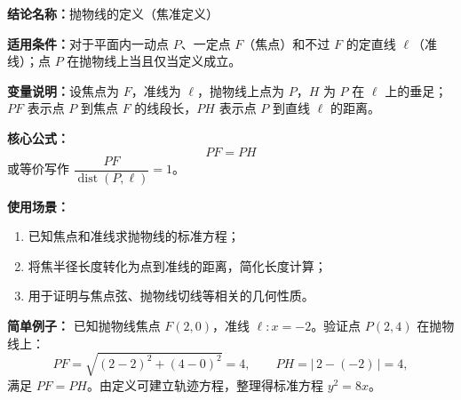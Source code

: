 \textbf{结论名称：}抛物线的定义（焦准定义）

\textbf{适用条件：}对于平面内一动点 \(P\)、一定点 \(F\)（焦点）和不过 \(F\) 的定直线 \(\ell\)（准线）；点 \(P\) 在抛物线上当且仅当定义成立。

\textbf{变量说明：}设焦点为 \(F\)，准线为 \(\ell\)，抛物线上点为 \(P\)，\(H\) 为 \(P\) 在 \(\ell\) 上的垂足；\(PF\) 表示点 \(P\) 到焦点 \(F\) 的线段长，\(PH\) 表示点 \(P\) 到直线 \(\ell\) 的距离。

\textbf{核心公式：}
\[
\boxed{PF = PH}
\]
或等价写作 \( \dfrac{PF}{\operatorname{dist}(P,\ell)} = 1 \)。

\textbf{使用场景：}
\begin{enumerate}
\item 已知焦点和准线求抛物线的标准方程；
\item 将焦半径长度转化为点到准线的距离，简化长度计算；
\item 用于证明与焦点弦、抛物线切线等相关的几何性质。
\end{enumerate}

\textbf{简单例子：}
已知抛物线焦点 \(F(2,0)\)，准线 \(\ell: x=-2\)。验证点 \(P(2,4)\) 在抛物线上：
\[
PF = \sqrt{(2-2)^2 + (4-0)^2} = 4,\qquad
PH = |\,2 - (-2)\,| = 4,
\]
满足 \(PF = PH\)。由定义可建立轨迹方程，整理得标准方程 \(y^2 = 8x\)。